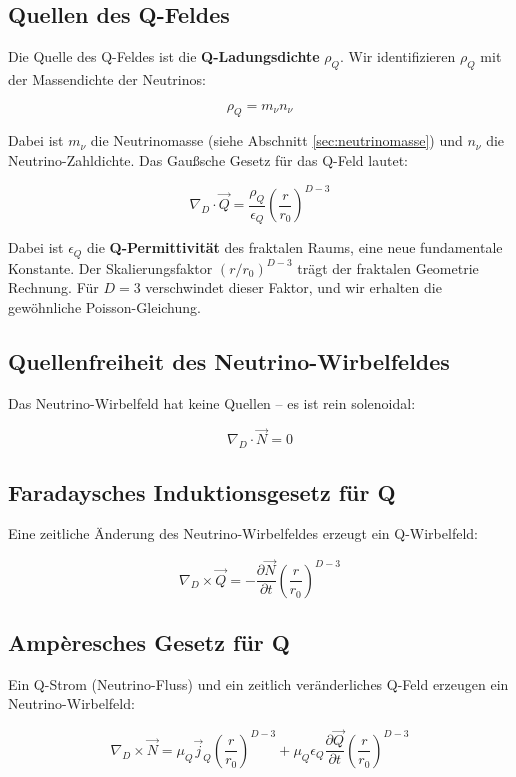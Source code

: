 \documentclass[12pt,a4paper]{article}
\begin{document}
\subsection{Quellen des Q-Feldes}

Die Quelle des Q-Feldes ist die \textbf{Q-Ladungsdichte} \(\rho_Q\). Wir identifizieren \(\rho_Q\) mit der Massendichte der Neutrinos:

\[
\rho_Q = m_\nu n_\nu
\]

Dabei ist \(m_\nu\) die Neutrinomasse (siehe Abschnitt \ref{sec:neutrinomasse}) und \(n_\nu\) die Neutrino-Zahldichte. Das Gaußsche Gesetz für das Q-Feld lautet:

\[
\boxed{\nabla_D \cdot \vec{Q} = \frac{\rho_Q}{\epsilon_Q} \left( \frac{r}{r_0} \right)^{D-3}} \tag{1}
\]

Dabei ist \(\epsilon_Q\) die \textbf{Q-Permittivität} des fraktalen Raums, eine neue fundamentale Konstante. Der Skalierungsfaktor \((r/r_0)^{D-3}\) trägt der fraktalen Geometrie Rechnung. Für \(D = 3\) verschwindet dieser Faktor, und wir erhalten die gewöhnliche Poisson-Gleichung.

\subsection{Quellenfreiheit des Neutrino-Wirbelfeldes}

Das Neutrino-Wirbelfeld hat keine Quellen – es ist rein solenoidal:

\[
\boxed{\nabla_D \cdot \vec{N} = 0} \tag{2}
\]

\subsection{Faradaysches Induktionsgesetz für Q}

Eine zeitliche Änderung des Neutrino-Wirbelfeldes erzeugt ein Q-Wirbelfeld:

\[
\boxed{\nabla_D \times \vec{Q} = -\frac{\partial \vec{N}}{\partial t} \left( \frac{r}{r_0} \right)^{D-3}} \tag{3}
\]

\subsection{Ampèresches Gesetz für Q}

Ein Q-Strom (Neutrino-Fluss) und ein zeitlich veränderliches Q-Feld erzeugen ein Neutrino-Wirbelfeld:

\[
\boxed{\nabla_D \times \vec{N} = \mu_Q \vec{j}_Q \left( \frac{r}{r_0} \right)^{D-3} + \mu_Q \epsilon_Q \frac{\partial \vec{Q}}{\partial t} \left( \frac{r}{r_0} \right)^{D-3}} \tag{4}
\]
\end{document}
